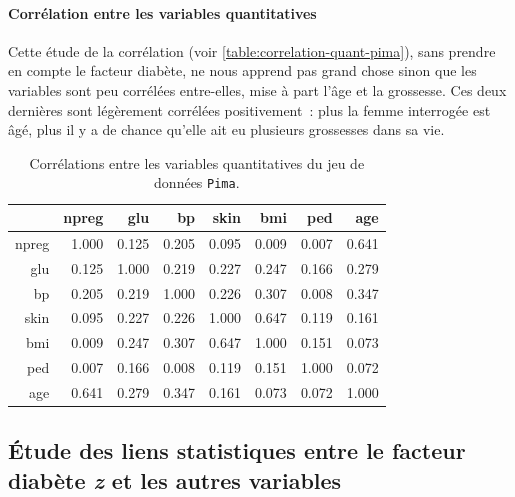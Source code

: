 \documentclass[a4paper,10pt]{report}
\begin{document}
\paragraph{Corrélation entre les variables quantitatives}

Cette étude de la corrélation (voir \autoref{table:correlation-quant-pima}), sans prendre en compte le facteur diabète, ne nous apprend pas grand chose sinon que les variables sont peu corrélées entre-elles, mise à part l'âge et la grossesse. Ces deux dernières sont légèrement corrélées positivement~: plus la femme interrogée est âgé, plus il y a de chance qu'elle ait eu plusieurs grossesses dans sa vie.


\begin{table}[H]
	\centering
	\captionsetup{justification=centering, margin=4cm}
	\caption{Corrélations entre les variables quantitatives du jeu de données \texttt{Pima}.}
	\begin{tabular}{r|rrrrrrr}
		& npreg & glu & bp & skin & bmi & ped & age \\ 
		\hline
		npreg & 1.000 & 0.125 & 0.205 & 0.095 & 0.009 & 0.007 & 0.641 \\ 
		glu & 0.125 & 1.000 & 0.219 & 0.227 & 0.247 & 0.166 & 0.279 \\ 
		bp & 0.205 & 0.219 & 1.000 & 0.226 & 0.307 & 0.008 & 0.347 \\ 
		skin & 0.095 & 0.227 & 0.226 & 1.000 & 0.647 & 0.119 & 0.161 \\ 
		bmi & 0.009 & 0.247 & 0.307 & 0.647 & 1.000 & 0.151 & 0.073 \\ 
		ped & 0.007 & 0.166 & 0.008 & 0.119 & 0.151 & 1.000 & 0.072 \\ 
		age & 0.641 & 0.279 & 0.347 & 0.161 & 0.073 & 0.072 & 1.000 \\ 
	\end{tabular}
	\label{table:correlation-quant-pima}
\end{table}


\subsection{Étude des liens statistiques entre le facteur diabète \textit{z} et les autres variables}
\end{document}

